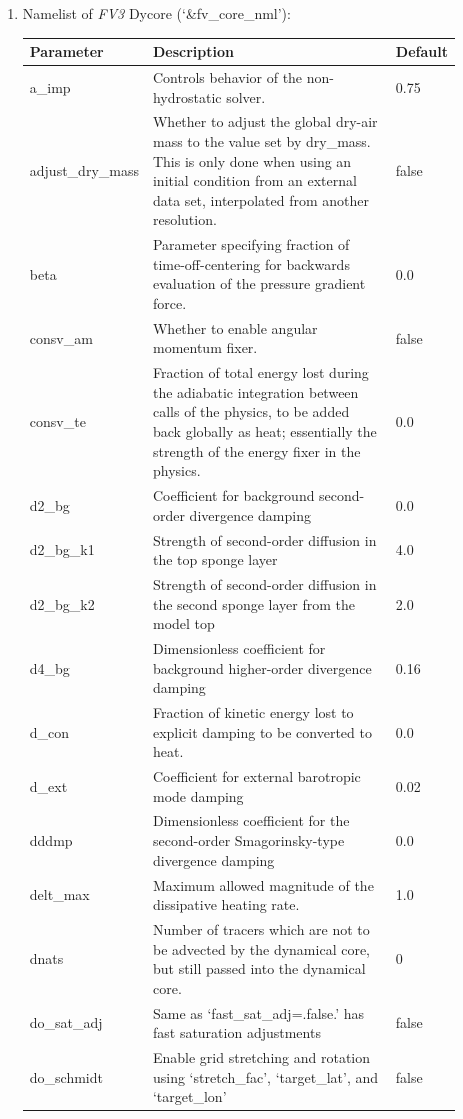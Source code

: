 \documentclass[11pt,fleqn]{report}              %
\begin{document}
\begin{enumerate}
\item Namelist of {\it FV3} Dycore (`\&fv\_core\_nml'):
{
\scriptsize
\begin{longtable}{p{0.13\linewidth} | p{0.69\linewidth} | p{0.08\linewidth} }
\hline
\hline
Parameter & Description & Default \\
\hline
a\_imp & Controls behavior of the non-hydrostatic solver. & 0.75 \\
adjust\_dry\_mass & Whether to adjust the global dry-air mass to the value set by dry\_mass. This is only done when using an initial condition from an external data set, interpolated from another resolution. & false \\
beta & Parameter specifying fraction of time-off-centering for backwards evaluation of the pressure gradient force. & 0.0 \\
consv\_am & Whether to enable angular momentum fixer. & false \\
consv\_te & Fraction of total energy lost during the adiabatic integration between calls of the physics, to be added back globally as heat; essentially the strength of the energy fixer in the physics. & 0.0 \\
d2\_bg & Coefficient for background second-order divergence damping & 0.0 \\
d2\_bg\_k1 & Strength of second-order diffusion in the top sponge layer & 4.0 \\
d2\_bg\_k2 & Strength of second-order diffusion in the second sponge layer from the model top & 2.0 \\
d4\_bg & Dimensionless coefficient for background higher-order divergence damping & 0.16 \\
 d\_con & Fraction of kinetic energy lost to explicit damping to be converted to heat. & 0.0 \\
 d\_ext & Coefficient for external barotropic mode damping & 0.02 \\
 dddmp & Dimensionless coefficient for the second-order Smagorinsky-type divergence damping & 0.0 \\
 delt\_max & Maximum allowed magnitude of the dissipative heating rate. & 1.0 \\
 dnats & Number of tracers which are not to be advected by the dynamical core, but still passed into the dynamical core. & 0 \\
 do\_sat\_adj & Same as `fast\_sat\_adj=.false.' has fast saturation adjustments & false \\
 do\_schmidt & Enable grid stretching and rotation using `stretch\_fac', `target\_lat', and `target\_lon' & false \\

\end{longtable}}
\end{enumerate}
\end{document}
